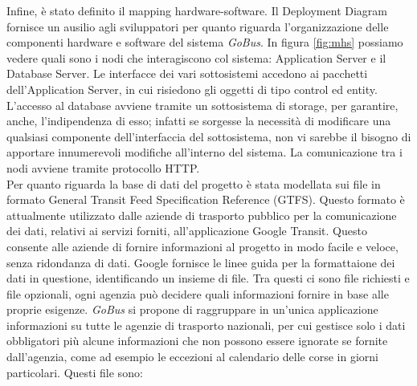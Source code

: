 Infine, \`{e} stato definito il mapping hardware-software. Il Deployment Diagram fornisce un ausilio agli sviluppatori per quanto riguarda l\rq organizzazione delle componenti hardware e software del sistema \emph{GoBus}. In figura \ref{fig:mhs} possiamo vedere quali sono i nodi che interagiscono col sistema: Application Server e il Database Server. Le interfacce dei vari sottosistemi accedono ai pacchetti dell\rq Application Server, in cui risiedono gli oggetti di tipo control ed entity. L\rq accesso al database avviene tramite un sottosistema di storage, per garantire, anche, l\rq indipendenza di esso; infatti se sorgesse la necessit\`{a} di modificare una qualsiasi componente dell\rq interfaccia del sottosistema, non vi sarebbe il bisogno di apportare innumerevoli modifiche all\rq interno del sistema. La comunicazione tra i nodi avviene tramite protocollo HTTP.\\
Per quanto riguarda la base di dati del progetto \`{e} stata modellata sui file in formato General Transit Feed Specification Reference (GTFS). Questo formato \`{e} attualmente utilizzato dalle aziende di trasporto pubblico per la comunicazione dei dati, 
relativi ai servizi forniti, all\rq applicazione Google Transit. Questo consente alle aziende di 
fornire informazioni al progetto in modo facile e veloce, senza ridondanza di dati. 
Google fornisce le linee guida per la formattaione dei dati in questione, identificando un 
insieme di file. Tra questi ci sono file richiesti e file opzionali, ogni agenzia pu\`{o} decidere 
quali informazioni fornire in base alle proprie esigenze. \emph{GoBus} si propone di raggruppare 
in un\rq unica applicazione informazioni su tutte le agenzie di trasporto nazionali, per cui 
gestisce solo i dati obbligatori pi\`{u} alcune informazioni che non possono essere ignorate 
se fornite dall\rq agenzia, come ad esempio le eccezioni al calendario delle corse in giorni 
particolari. Questi file sono:\\

